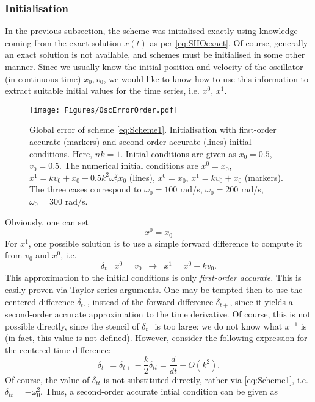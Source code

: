 \documentclass[11pt,twoside,a4paper,english]{book}
\newcommand{\dtp}{\delta_{t+}}
\newcommand{\dtd}{\delta_{t\cdot}}
\newcommand{\dtt}{\delta_{tt}}
\begin{document}
\subsubsection{Initialisation}\label{sec:Init}
In the previous subsection, the scheme was initialised exactly using knowledge coming from the exact solution $x(t)$ as per \eqref{eq:SHOexact}. Of course, generally an exact solution is not available, and schemes must be initialised in some other manner. Since we usually know the initial position and velocity of the oscillator (in continuous time) $x_0, v_0$, we would like to know how to use this information to extract suitable initial values for the time series, i.e. $x^0$, $x^1$.
\begin{figure}[hbt]
    \centering
    \texttt{[image: Figures/OscErrorOrder.pdf]}
    \caption{Global error of scheme \eqref{eq:Scheme1}. Initialisation with first-order accurate (markers) and second-order accurate (lines) initial conditions. Here, $nk = 1$. Initial conditions are given as $x_0 = 0.5$, $v_0 = 0.5$. The numerical initial conditions are $x^0 = x_0$, $x^1 = kv_0 + x_0 - 0.5 k^2 \omega_0^2 x_0$ (lines), $x^0 = x_0$, $x^1 = kv_0 + x_0$ (markers). The three cases correspond to $\omega_0 = 100$ rad/s, $\omega_0 = 200$ rad/s, $\omega_0 = 300$ rad/s.}\label{fig:SHOerrsOrders}
\end{figure}
Obviously, one can set 
\begin{equation}
    x^0=x_0
\end{equation}
For $x^1$, one possible solution is to use a simple forward difference to compute it from $v_0$ and $x^0$, i.e. 
\begin{equation}
    \dtp x^0 = v_0 \,\,\, \rightarrow \,\,\, x^1 = x^0 + kv_0.
\end{equation}
This approximation to the initial conditions is only \emph{first-order accurate.} This is easily proven via Taylor series arguments. One may be tempted then to use the centered difference $\dtd$, instead of the forward difference $\dtp$, since it yields a second-order accurate approximation to the time derivative. Of course, this is not possible directly, since the stencil of $\dtd$ is too large: we do not know what $x^{-1}$ is (in fact, this value is not defined). However, consider the following expression for the centered time difference:
\begin{equation}\label{eq:dtdInit}
    \dtd = \dtp - \frac{k}{2} \dtt = \frac{d}{dt} + O(k^2).
\end{equation}
Of course, the value of $\dtt$ is not substituted directly, rather via \eqref{eq:Scheme1}, i.e. $\dtt = -\omega_0^2$. Thus, a second-order accurate intial condition can be given as
\end{document}
